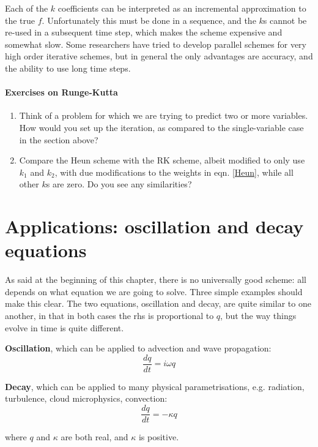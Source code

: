 Each of the $k$ coefficients can be interpreted as an incremental approximation to the true $f$. Unfortunately this must be done in a sequence, and the $k$s cannot be re-used in a subsequent time step, which makes the scheme expensive and somewhat slow. Some researchers have tried to develop parallel schemes for very high order iterative schemes, but in general the only advantages are accuracy, and the ability to use long time steps.

\paragraph{Exercises on Runge-Kutta}
\begin{enumerate}
	\item Think of a problem for which we are trying to predict two or more variables. How would you set up the iteration, as compared to the single-variable case in the section above?
	\item Compare the Heun scheme with the RK scheme, albeit modified to only use $k_1$ and $k_2$, with due modifications to the weights in eqn. \ref{Heun}, while all other $k$s are zero. Do you see any similarities?
\end{enumerate}
	
\section{Applications: oscillation and decay equations}
As said at the beginning of this chapter, there is no universally good scheme: all depends on what equation we are going to solve. Three simple examples should make this clear. The two equations, oscillation and decay, are quite similar to one another, in that in both cases the rhs is proportional to $q$, but the way things evolve in time is quite different.

{\bf Oscillation}, which can be applied to advection and wave propagation:
\begin{equation}
	\frac{dq}{dt}= i \omega q
	\label{oscillation}
\end{equation}

{\bf Decay}, which can be applied to many physical parametrisations, e.g. radiation, turbulence, cloud microphysics, convection:
\begin{equation}
	\frac{dq}{dt}= - \kappa q
	\label{decay}
\end{equation}

where $q$ and $\kappa$ are both real, and $\kappa$ is positive.

